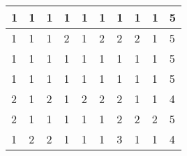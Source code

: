 \begin{table}[!ht]
\begin{tabular}{|l|l|l||l|l|l||l|l|l|l|}
        1 & 1 & 1 & 1 & 1 & 1 & 1 & 1 & 1 & 5 \\ \hline
        1 & 1 & 1 & 2 & 1 & 2 & 2 & 2 & 1 & 5 \\ \hline
        1 & 1 & 1 & 1 & 1 & 1 & 1 & 1 & 1 & 5 \\ \hline
        1 & 1 & 1 & 1 & 1 & 1 & 1 & 1 & 1 & 5 \\ \hline
        2 & 1 & 2 & 1 & 2 & 2 & 2 & 1 & 1 & 4 \\ \hline
        2 & 1 & 1 & 1 & 1 & 1 & 2 & 2 & 2 & 5 \\ \hline
        1 & 2 & 2 & 1 & 1 & 1 & 3 & 1 & 1 & 4 \\ \hline
    \end{tabular}
\end{table}


